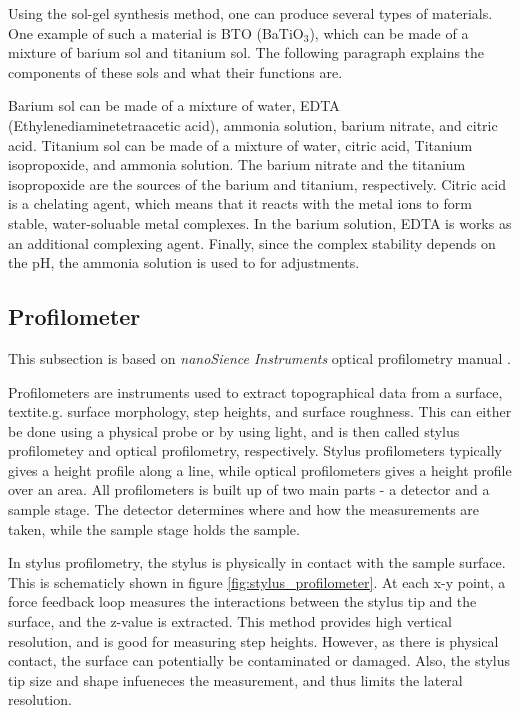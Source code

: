 \noindent Using the sol-gel synthesis method, one can produce several types of materials.
One example of such a material is BTO (BaTiO$_3$), which can be made of a mixture of barium sol and titanium sol.
The following paragraph explains the components of these sols and what their functions are.

Barium sol can be made of a mixture of water, EDTA (Ethylenediaminetetraacetic acid), ammonia solution, barium nitrate, and citric acid.
Titanium sol can be made of a mixture of water, citric acid, Titanium isopropoxide, and ammonia solution.
The barium nitrate and the titanium isopropoxide are the sources of the barium and titanium, respectively.
Citric acid is a chelating agent, which means that it reacts with the metal ions to form stable, water-soluable metal complexes.
In the barium solution, EDTA is works as an additional complexing agent.
Finally, since the complex stability depends on the pH, the ammonia solution is used to for adjustments.

\subsection{Profilometer}

\noindent This subsection is based on \textit{nanoSience Instruments} optical profilometry manual \cite{profilometer_manual}.

Profilometers are instruments used to extract topographical data from a surface, textit{e.g.} surface morphology, step heights, and surface roughness.
This can either be done using a physical probe or by using light, and is then called stylus profilometey and optical profilometry, respectively.
Stylus profilometers typically gives a height profile along a line, while optical profilometers gives a height profile over an area.
All profilometers is built up of two main parts - a detector and a sample stage. 
The detector determines where and how the measurements are taken, while the sample stage holds the sample.

In stylus profilometry, the stylus is physically in contact with the sample surface. 
This is schematicly shown in figure \autoref{fig:stylus_profilometer}.
At each x-y point, a force feedback loop measures the interactions between the stylus tip and the surface, and the z-value is extracted.
This method provides high vertical resolution, and is good for measuring step heights. 
However, as there is physical contact, the surface can potentially be contaminated or damaged.
Also, the stylus tip size and shape infueneces the measurement, and thus limits the lateral resolution.

